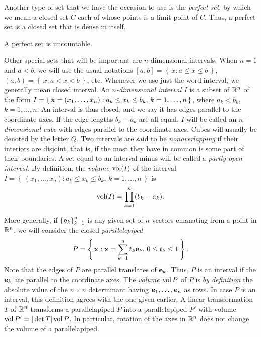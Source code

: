Another type of set that we have the occasion to use is the \emph{perfect
  set}, by which we mean a closed set $C$ each of whose points is a limit
point of $C$. Thus, a perfect set is a closed set that is dense in itself.

\begin{theorem}[1.9]
A perfect set is uncountable.
\end{theorem}

Other special sets that will be important are $n$-dimensional
intervals. When $n=1$ and $a<b$, we will use the usual notations
$[a,b]=\left\{\,x:a\leq x\leq b\,\right\}$,
$(a,b)=\left\{\,x:a<x<b\,\right\}$, etc. Whenever we use just the
word interval, we generally mean closed interval. An \emph{$n$-dimensional
  interval $I$} is a subset of $\mathbb{R}^n$ of the form
$I=\left\{\,\mathbf{x}=(x_1,\dotsc,x_n):\text{$a_k\leq x_k\leq b_k$,
    $k=1,\dotsc,n$}\,\right\}$, where $a_k<b_k$, $k=1,\dotsc,n$. An
interval is thus closed, and we say it has edges parallel to the coordinate
axes. If the edge lengths $b_k-a_k$ are all equal, $I$ will be called an
\emph{$n$-dimensional cube} with edges parallel to the coordinate
axes. Cubes will usually be denoted by the letter $Q$. Two intervals are
said to be \emph{nonoverlapping} if their interiors are disjoint, that is,
if the most they have in common is some part of their boundaries. A set
equal to an interval minus will be called a \emph{partly-open interval}. By
definition, the \emph{volume $\operatorname{vol}(I)$} of the interval
$I=\left\{\,(x_1,\dotsc,x_n):\text{$a_k\leq x_k\leq b_k$,
    $k=1,\dotsc,n$}\,\right\}$ is
\begin{equation}
  \label{eq:volume-i}
\operatorname{vol}(I)=\prod_{k=1}^n(b_k-a_k).
\end{equation}

More generally, if ${\{\mathbf{e}_k\}}_{k=1}^n$ is any given set of $n$ vectors
emanating from a point in $\mathbb{R}^n$, we will consider the closed
\emph{parallelepiped}
\begin{equation}
  \label{eq:parallelepiped}
P=\left\{\,\mathbf{x}:\text{$\mathbf{x}=\sum_{k=1}^n t_k\mathbf{e}_k$, $0\leq t_k\leq
    1$}\,\right\}.
\end{equation}
Note that the edges of $P$ are parallel translates of $\mathbf{e}_k$. Thus, $P$
is an interval if the $\mathbf{e}_k$ are parallel to the coordinate axes. The
\emph{volume $\operatorname{vol} P$} of $P$ is \emph{by definition} the absolute value of
the $n\times n$ determinant having $\mathbf{e}_1,\dotsc,\mathbf{e}_n$ as rows. In case
$P$ is an interval, this definition agrees with the one given earlier. A
linear transformation $T$ of $\mathbb{R}^n$ transforms a parallelapiped $P$ into
a parallelapiped $P'$ with volume $\operatorname{vol} P'=|\det T|\operatorname{vol} P$. In particular,
rotation of the axes in $\mathbb{R}^n$ does not change the volume of a
parallelapiped.

